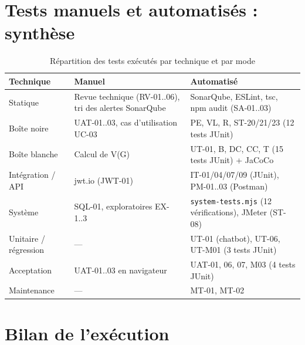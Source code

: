 \documentclass[12pt,a4paper]{report}
\begin{document}
\section{Tests manuels et automatisés : synthèse}
\begin{table}[H]
\centering
\caption{Répartition des tests exécutés par technique et par mode}
\small
\begin{tabularx}{\textwidth}{@{}p{3.6cm}XX@{}}
\toprule
\rowcolor{evlight}\textbf{Technique} & \textbf{Manuel} & \textbf{Automatisé}\\
\midrule
Statique & Revue technique (RV-01..06), tri des alertes SonarQube & SonarQube, ESLint, tsc, npm audit (SA-01..03)\\
Boîte noire & UAT-01..03, cas d'utilisation UC-03 & PE, VL, R, ST-20/21/23 (12 tests JUnit)\\
Boîte blanche & Calcul de V(G) & UT-01, B, DC, CC, T (15 tests JUnit) + JaCoCo\\
Intégration / API & jwt.io (JWT-01) & IT-01/04/07/09 (JUnit), PM-01..03 (Postman)\\
Système & SQL-01, exploratoires EX-1..3 & \texttt{system-tests.mjs} (12 vérifications), JMeter (ST-08)\\
Unitaire / régression & --- & UT-01 (chatbot), UT-06, UT-M01 (3 tests JUnit)\\
Acceptation & UAT-01..03 en navigateur & UAT-01, 06, 07, M03 (4 tests JUnit)\\
Maintenance & --- & MT-01, MT-02\\
\bottomrule
\end{tabularx}
\end{table}

\section{Bilan de l'exécution}
\end{document}
